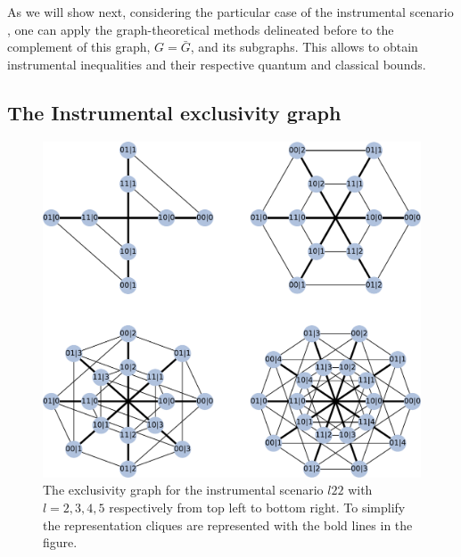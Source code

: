 \documentclass[letterpaper]{article}
\begin{document}
As we will show next, considering the particular case of the instrumental
scenario \cite{}, one can apply the graph-theoretical methods delineated before
to the complement of this graph, $G=\bar{G}$, and its subgraphs. This allows to
obtain instrumental inequalities and their respective quantum and
classical bounds.

\subsection{The Instrumental exclusivity graph}
\begin{figure}[t]
    \centering
    \includegraphics[width=\columnwidth]{images/instrumental_exgraph.pdf}
    \caption{
    The exclusivity graph for the instrumental scenario $l22$ with $l=2,3,4,5$
    respectively from top left to bottom right. 
    To simplify the representation cliques are represented with the bold lines
    in the figure.}
    \label{fig:instrumental_exgraphs}
\end{figure}

\end{document}
